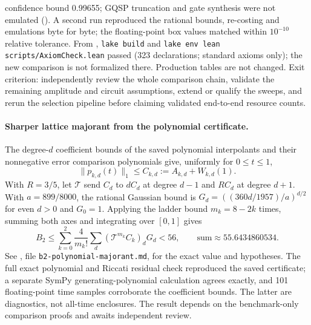 \documentclass[11pt,a4paper]{article}
\begin{document}
confidence bound 0.99655; GQSP truncation and gate synthesis were not
emulated (). A second run
reproduced the rational bounds, re-costing and emulations byte for byte; the
floating-point box values matched within $10^{-10}$ relative tolerance. From
, \texttt{lake build} and \texttt{lake env lean
scripts/AxiomCheck.lean} passed (323 declarations; standard axioms only); the
new comparison is not formalized there. Production tables are not changed.
Exit criterion: independently review the whole comparison chain,
validate the remaining amplitude and circuit assumptions, extend or qualify
the sweeps, and rerun the selection pipeline before claiming validated
end-to-end resource counts.

\paragraph{Sharper lattice majorant from the polynomial certificate.}
The degree-$d$ coefficient bounds of the saved polynomial interpolants and
their nonnegative error comparison polynomials give, uniformly for
$0\le t\le1$,
\[
 \|p_{k,d}(t)\|_1\le C_{k,d}:=A_{k,d}+W_{k,d}(1).
\]
With $R=3/5$, let $\mathcal T$ send $C_d$ to $dC_d$ at degree $d-1$ and
$RC_d$ at degree $d+1$. With $a=899/8000$, the rational Gaussian bound is
$G_d=((360d/1957)/a)^{d/2}$ for even $d>0$ and $G_0=1$. Applying the
ladder bound $m_k=8-2k$ times, summing both axes and integrating over
$[0,1]$ gives
\[
 B_2\le\sum_{k=0}^2\frac4{m_k!}\sum_d(\mathcal T^{m_k}C_k)_dG_d<56,
 \qquad\text{sum}\approx55.6434860534.
\]
See , file \texttt{b2-polynomial-majorant.md}, for
the exact value and hypotheses. The full exact polynomial and
Riccati residual check reproduced the saved certificate; a separate SymPy
generating-polynomial calculation agrees exactly, and 101 floating-point
time samples corroborate the coefficient bounds. The latter are diagnostics,
not all-time enclosures. The result depends on the benchmark-only comparison
proofs and awaits independent review.
\end{document}
